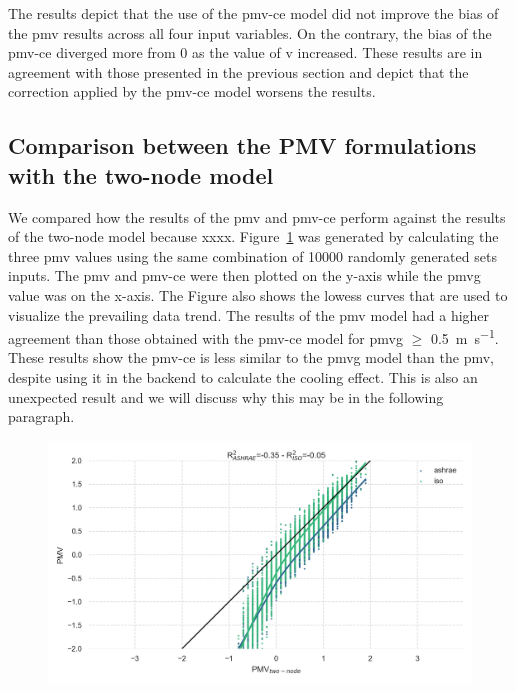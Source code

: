 The results depict that the use of the \ac{pmv-ce} model did not improve the bias of the \ac{pmv} results across all four input variables.
On the contrary, the bias of the \ac{pmv-ce} diverged more from 0 as the value of \ac{v} increased.
These results are in agreement with those presented in the previous section and depict that the correction applied by the \ac{pmv-ce} model worsens the results. 

\subsection{Comparison between the PMV formulations with the two-node model}\label{subsec:comparison-between-the-pmv-formulations-wih-the-two-node-model}
We compared how the results of the \ac{pmv} and \ac{pmv-ce} perform against the results of the two-node model because xxxx.
Figure~\ref{fig:pmv_two_node_comparison} was generated by calculating the three \ac{pmv} values using the same combination of \num{10000} randomly generated sets inputs.
The \ac{pmv} and \ac{pmv-ce} were then plotted on the y-axis while the \ac{pmvg} value was on the x-axis.
The Figure also shows the \ac{lowess} curves that are used to visualize the prevailing data trend.
The results of the \ac{pmv} model had a higher agreement than those obtained with the \ac{pmv-ce} model for \ac{pmvg} $\geq$ \qty{0.5}{\m\per\s}.
These results show the \ac{pmv-ce} is less similar to the \ac{pmvg} model than the \ac{pmv}, despite using it in the backend to calculate the cooling effect.
This is also an unexpected result and we will discuss why this may be in the following paragraph. 

\begin{figure}[htb!]
    \centering
    \includegraphics[width=\textwidth]{figures/pmv_two_node_comparison}
    \caption{}
    \label{fig:pmv_two_node_comparison}
\end{figure}

